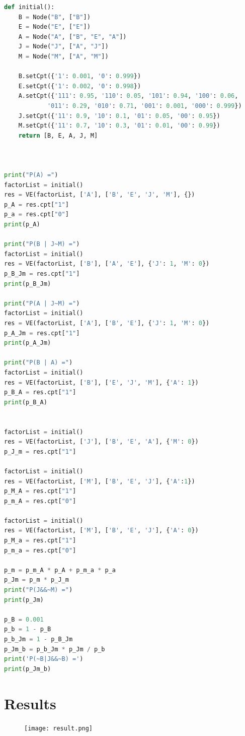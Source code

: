 ﻿\documentclass[a4paper, 11pt]{article}
\begin{document}
\begin{lstlisting}[language=Python,frame=single]
def initial():
    B = Node("B", ["B"])
    E = Node("E", ["E"])
    A = Node("A", ["B", "E", "A"])
    J = Node("J", ["A", "J"])
    M = Node("M", ["A", "M"])

    B.setCpt({'1': 0.001, '0': 0.999})
    E.setCpt({'1': 0.002, '0': 0.998})
    A.setCpt({'111': 0.95, '110': 0.05, '101': 0.94, '100': 0.06,
            '011': 0.29, '010': 0.71, '001': 0.001, '000': 0.999})
    J.setCpt({'11': 0.9, '10': 0.1, '01': 0.05, '00': 0.95})
    M.setCpt({'11': 0.7, '10': 0.3, '01': 0.01, '00': 0.99})
    return [B, E, A, J, M]



print("P(A) =")
factorList = initial()
res = VE(factorList, ['A'], ['B', 'E', 'J', 'M'], {})
p_A = res.cpt["1"]
p_a = res.cpt["0"]
print(p_A)

print("P(B | J~M) =")
factorList = initial()
res = VE(factorList, ['B'], ['A', 'E'], {'J': 1, 'M': 0})
p_B_Jm = res.cpt["1"]
print(p_B_Jm)

print("P(A | J~M) =")
factorList = initial()
res = VE(factorList, ['A'], ['B', 'E'], {'J': 1, 'M': 0})
p_A_Jm = res.cpt["1"]
print(p_A_Jm)

print("P(B | A) =")
factorList = initial()
res = VE(factorList, ['B'], ['E', 'J', 'M'], {'A': 1})
p_B_A = res.cpt["1"]
print(p_B_A)


factorList = initial()
res = VE(factorList, ['J'], ['B', 'E', 'A'], {'M': 0})
p_J_m = res.cpt["1"]

factorList = initial()
res = VE(factorList, ['M'], ['B', 'E', 'J'], {'A':1})
p_M_A = res.cpt["1"]
p_m_A = res.cpt["0"]

factorList = initial()
res = VE(factorList, ['M'], ['B', 'E', 'J'], {'A': 0})
p_M_a = res.cpt["1"]
p_m_a = res.cpt["0"]

p_m = p_m_A * p_A + p_m_a * p_a
p_Jm = p_m * p_J_m
print("P(J&&~M) =")
print(p_Jm)

p_B = 0.001
p_b = 1 - p_B
p_b_Jm = 1 - p_B_Jm
p_Jm_b = p_b_Jm * p_Jm / p_b
print('P(~B|J&&~B) =')
print(p_Jm_b)
\end{lstlisting}

\section{Results}
\begin{figure}[h]
  \centering

  \texttt{[image: result.png]}
\end{figure}

%
%
\end{document}
